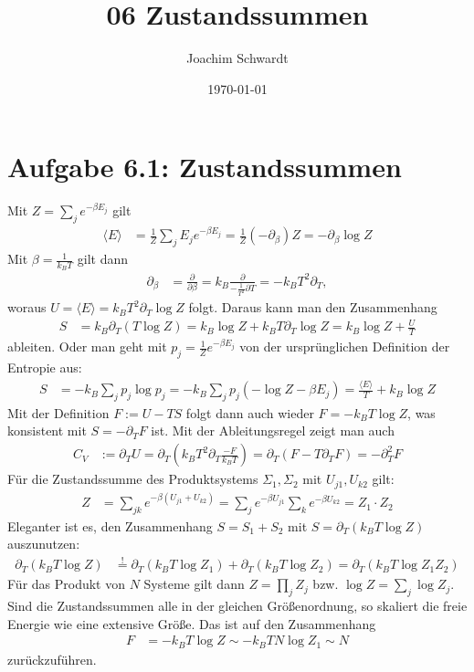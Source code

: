 \documentclass[a4paper,12pt]{article}
\newcommand{\bra}{}
\newcommand{\kla}{}
\begin{document}
\title{06 Zustandssummen}
\author{Joachim Schwardt}
\date{\today}
\maketitle

\section*{Aufgabe 6.1: Zustandssummen}
Mit $Z=\sum_je^{-\beta E_j}$ gilt
\begin{align*}
\bra\langle {E}\rangle&=\frac{1}{Z}\sum_jE_je^{-\beta E_j}=\frac{1}{Z}(-\partial_\beta)Z=-\partial_\beta\log Z
\end{align*}
Mit $\beta=\frac{1}{k_BT}$ gilt dann
\begin{align*}
\partial_\beta&=\frac{\partial}{\partial\beta}=k_B\frac{\partial}{-\frac{1}{T^2}\partial T}=-k_BT^2\partial_T,
\end{align*}
woraus $U=\bra\langle {E}\rangle=k_BT^2\partial_T\log Z$ folgt. Daraus kann man den Zusammenhang
\begin{align*}
S&=k_B\partial_T(T\log Z)=k_B\log Z+k_BT\partial_T\log Z=k_B\log Z+\frac{U}{T}
\end{align*}
ableiten. Oder man geht mit $p_j=\frac{1}{Z}e^{-\beta E_j}$ von der ursprünglichen Definition der Entropie aus:
\begin{align*}
S&=-k_B\sum_jp_j\log p_j=-k_B\sum_jp_j\kla\left( {-\log Z-\beta E_j} \right)=\frac{\bra\langle {E}\rangle}{T}+k_B\log Z
\end{align*}
Mit der Definition $F:=U-TS$ folgt dann auch wieder $F=-k_BT\log Z$, was konsistent mit $S=-\partial_TF$ ist. Mit der Ableitungsregel zeigt man auch
\begin{align*}
C_V&:=\partial_TU=\partial_T\kla\left( {k_BT^2\partial_T\frac{-F}{k_BT}} \right)=\partial_T\kla\left( {F-T\partial_TF} \right)=-\partial_T^2F
\end{align*}
Für die Zustandssumme des Produktsystems $\Sigma_1,\Sigma_2$ mit $U_{j1},U_{k2}$ gilt:
\begin{align*}
Z&=\sum_{jk}e^{-\beta (U_{j1}+U_{k2})}=\sum_je^{-\beta U_{j1}}\sum_ke^{-\beta U_{k2}}=Z_1\cdot Z_2
\end{align*}
Eleganter ist es, den Zusammenhang $S=S_1+S_2$ mit $S=\partial_T(k_BT\log Z)$ auszunutzen:
\begin{align*}
\partial_T(k_BT\log Z)&\overset{!}{=}\partial_T(k_BT\log Z_1)+\partial_T(k_BT\log Z_2)=\partial_T(k_BT\log Z_1Z_2)
\end{align*}
Für das Produkt von $N$ Systeme gilt dann $Z=\prod_jZ_j$ bzw. $\log Z=\sum_j\log Z_j$. Sind die Zustandssummen alle in der gleichen Größenordnung, so skaliert die freie Energie wie eine extensive Größe. Das ist auf den Zusammenhang
\begin{align*}
F&=-k_BT\log Z\sim -k_BTN\log Z_1\sim N
\end{align*}
zurückzuführen.
\end{document}
